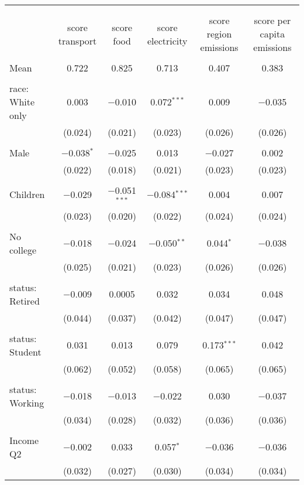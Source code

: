 
\begin{tabular}{@{\extracolsep{5pt}}lccccc} 
\\[-1.8ex]\hline 
\hline \\[-1.8ex] 
\\[-1.8ex] & score transport & score food & score electricity & score region emissions & score per capita emissions \\ 
\hline \\[-1.8ex] 
 Mean & 0.722 & 0.825 & 0.713 & 0.407 & 0.383  \\ \hline \\[-1.8ex] race: White only & 0.003 & $-$0.010 & 0.072$^{***}$ & 0.009 & $-$0.035 \\ 
  & (0.024) & (0.021) & (0.023) & (0.026) & (0.026) \\ 
  & & & & & \\ 
 Male & $-$0.038$^{*}$ & $-$0.025 & 0.013 & $-$0.027 & 0.002 \\ 
  & (0.022) & (0.018) & (0.021) & (0.023) & (0.023) \\ 
  & & & & & \\ 
 Children & $-$0.029 & $-$0.051$^{***}$ & $-$0.084$^{***}$ & 0.004 & 0.007 \\ 
  & (0.023) & (0.020) & (0.022) & (0.024) & (0.024) \\ 
  & & & & & \\ 
 No college & $-$0.018 & $-$0.024 & $-$0.050$^{**}$ & 0.044$^{*}$ & $-$0.038 \\ 
  & (0.025) & (0.021) & (0.023) & (0.026) & (0.026) \\ 
  & & & & & \\ 
 status: Retired & $-$0.009 & 0.0005 & 0.032 & 0.034 & 0.048 \\ 
  & (0.044) & (0.037) & (0.042) & (0.047) & (0.047) \\ 
  & & & & & \\ 
 status: Student & 0.031 & 0.013 & 0.079 & 0.173$^{***}$ & 0.042 \\ 
  & (0.062) & (0.052) & (0.058) & (0.065) & (0.065) \\ 
  & & & & & \\ 
 status: Working & $-$0.018 & $-$0.013 & $-$0.022 & 0.030 & $-$0.037 \\ 
  & (0.034) & (0.028) & (0.032) & (0.036) & (0.036) \\ 
  & & & & & \\ 
 Income Q2 & $-$0.002 & 0.033 & 0.057$^{*}$ & $-$0.036 & $-$0.036 \\ 
  & (0.032) & (0.027) & (0.030) & (0.034) & (0.034) \\ 

\end{tabular}
